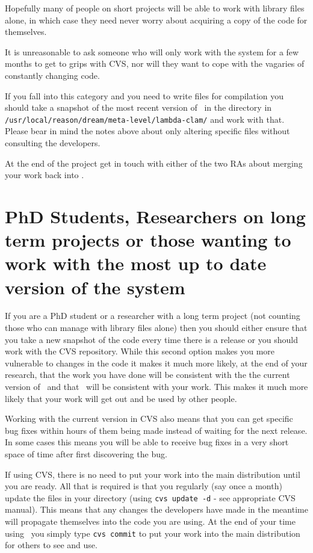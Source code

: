 Hopefully many of people on short projects will be able to work with
library files alone, in which case they need never worry about
acquiring a copy of the code for themselves.

It is unreasonable to ask someone who
will only work 
with the system for a few months to get to grips with CVS, nor will 
they want to cope with the vagaries of constantly changing code.  

If
you fall into this category and you
need to write files for compilation you should 
take a snapshot of the most recent version of \lclam\ in the directory in
{\tt /usr/local/reason/dream/meta-level/lambda-clam/} and work with
that.  Please bear in mind the notes above about only altering
specific files without consulting the developers.  

At the end of the project get in touch with either of the two RAs
about merging your work back into \lclam. 

\section{PhD Students, Researchers on long term projects or those
  wanting to work with the most up to date version of the system}

If you are a PhD student or a researcher with a long term project
(not counting those who can manage with 
library files alone) then you should either ensure that you take a new 
snapshot of the code every time there is a release or you should work
with the CVS repository.  While this second option makes you more
vulnerable to  
changes in the code it makes it much more
likely, at the end of your research, that the work you have done will be 
consistent with the the current version of \lclam\ and that \lclam\ will be
consistent with your work.  This makes it much more likely that your
work will get out and be used by other people.

Working with the current version in CVS also means that you can get
specific bug fixes within hours of them being made instead of waiting
for the next release.  In some cases this means you will be able to
receive bug fixes in a very short space of time after first
discovering the bug.

If using CVS, there is no need to put your work into the main
distribution until you  
are ready.  All that is required is that you regularly (say
once a month) update the files in your directory
(using {\tt cvs update -d} - see appropriate CVS manual).  This means
that any changes the developers have made in the meantime will
propagate themselves into the code you are using.  At the end of your
time using \lclam\ you simply type {\tt cvs commit} to put your work
into the main distribution for others to see and use.  

